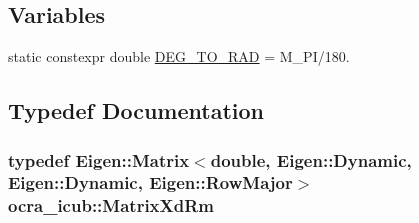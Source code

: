\subsection*{\-Variables}
\begin{DoxyCompactItemize}
\item 
static constexpr double \hyperlink{namespaceocra__icub_ab06477ded34ed5514b911a3511b22e3d}{\-D\-E\-G\-\_\-\-T\-O\-\_\-\-R\-A\-D} = \-M\-\_\-\-P\-I/180.
\end{DoxyCompactItemize}


\subsection{\-Typedef \-Documentation}
\hypertarget{namespaceocra__icub_aa5e36a19ed031c28ca83c207bd7dd83f}{
\subsubsection[{\-Matrix\-Xd\-Rm}]{\setlength{\rightskip}{0pt plus 5cm}typedef \-Eigen\-::\-Matrix$<$double, \-Eigen\-::\-Dynamic, \-Eigen\-::\-Dynamic, \-Eigen\-::\-Row\-Major$>$ {\bf ocra\-\_\-icub\-::\-Matrix\-Xd\-Rm}}}\label{namespaceocra__icub_aa5e36a19ed031c28ca83c207bd7dd83f}


